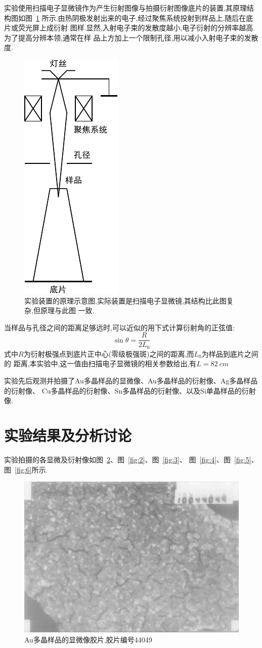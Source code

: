 \documentclass[aps,pre,12pt,preprint,onecolumn,showpacs,showkeys]{revtex4-1}
\begin{document}
实验使用扫描电子显微镜作为产生衍射图像与拍摄衍射图像底片的装置,其原理结构图如图~\ref{fig:ins}
所示.由热阴极发射出来的电子,经过聚焦系统投射到样品上,随后在底片或荧光屏上成衍射
图样.显然,入射电子束的发散度越小,电子衍射的分辨率越高.为了提高分辨本领,通常在样
品上方加上一个限制孔径,用以减小入射电子束的发散度.

\begin{figure}[htbp]
  \centering
\includegraphics[width=.2\textwidth]{graph.pdf}
\caption{\label{fig:ins}%
    实验装置的原理示意图,实际装置是扫描电子显微镜,其结构比此图复杂,但原理与此图
    一致.
}
\end{figure}


当样品与孔径之间的距离足够远时,可以近似的用下式计算衍射角的正弦值:
\begin{equation}
    \label{eq:theta}
    \sin{\theta} = \frac{R}{2L_0}
\end{equation}
式中$R$为衍射极强点到底片正中心(零级极强斑)之间的距离,而$L_0$为样品到底片之间的
距离,本实验中,这一值由扫描电子显微镜的相关参数给出,有$L = \SI{82}{cm}$

实验先后观测并拍摄了Au多晶样品的显微像、Au多晶样品的衍射像、Ag多晶样品的衍射像、
Cu多晶样品的衍射像、Sn多晶样品的衍射像、以及Si单晶样品的衍射像.

\section{实验结果及分析讨论}

实验拍摄的各显微及衍射像如图~\ref{fig:1}、图~\ref{fig:2}、图~\ref{fig:3}、
图~\ref{fig:4}、图~\ref{fig:5}、图~\ref{fig:6}所示.

\begin{figure}[htbp]
  \centering
\includegraphics[width=.7\textwidth]{4.pdf}
\caption{\label{fig:1}%
    Au多晶样品的显微像胶片,胶片编号44049
}
\end{figure}
\end{document}
